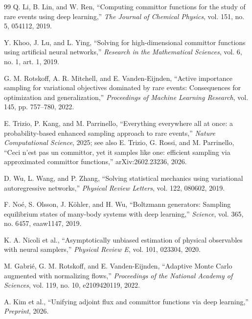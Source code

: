 \documentclass[a4paper,fleqn]{cas-sc}
\begin{document}
\begin{thebibliography}{99}
		Q. Li, B. Lin, and W. Ren, ``Computing committor functions for the study of rare events using deep learning,'' \emph{The Journal of Chemical Physics}, vol. 151, no. 5, 054112, 2019.
		
		Y. Khoo, J. Lu, and L. Ying, ``Solving for high-dimensional committor functions using artificial neural networks,'' \emph{Research in the Mathematical Sciences}, vol. 6, no. 1, art. 1, 2019.
		
		G. M. Rotskoff, A. R. Mitchell, and E. Vanden-Eijnden, ``Active importance sampling for variational objectives dominated by rare events: Consequences for optimization and generalization,'' \emph{Proceedings of Machine Learning Research}, vol. 145, pp. 757--780, 2022.
		
		E. Trizio, P. Kang, and M. Parrinello, ``Everything everywhere all at once: a probability-based enhanced sampling approach to rare events,'' \emph{Nature Computational Science}, 2025; see also E. Trizio, G. Rossi, and M. Parrinello, ``Ceci n'est pas un committor, yet it samples like one: efficient sampling via approximated committor functions,'' arXiv:2602.23236, 2026.
		
		D. Wu, L. Wang, and P. Zhang, ``Solving statistical mechanics using variational autoregressive networks,'' \emph{Physical Review Letters}, vol. 122, 080602, 2019.
		
		F. No\'{e}, S. Olsson, J. K\"{o}hler, and H. Wu, ``Boltzmann generators: Sampling equilibrium states of many-body systems with deep learning,'' \emph{Science}, vol. 365, no. 6457, eaaw1147, 2019.
		
		K. A. Nicoli et al., ``Asymptotically unbiased estimation of physical observables with neural samplers,'' \emph{Physical Review E}, vol. 101, 023304, 2020.
		
		M. Gabri\'{e}, G. M. Rotskoff, and E. Vanden-Eijnden, ``Adaptive Monte Carlo augmented with normalizing flows,'' \emph{Proceedings of the National Academy of Sciences}, vol. 119, no. 10, e2109420119, 2022.
		
		A. Kim et al., ``Unifying adjoint flux and committor functions via deep learning,'' \emph{Preprint}, 2026.
		
	\end{thebibliography}
	
\end{document}
